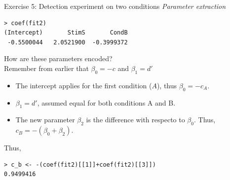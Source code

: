 \documentclass[10pt]{beamer}
\begin{document}
\begin{frame}[fragile]{Exercise 5: Detection experiment on two conditions}
\textit{Parameter extraction}
\begin{verbatim}
> coef(fit2)
(Intercept)       StimS       CondB 
 -0.5500044   2.0521900  -0.3999372 
\end{verbatim}

How are these parameters encoded?\\[10pt]
\pause
Remember from earlier that $\beta_0 = -c$ and $\beta_1 = d'$\\[5pt]

\begin{itemize}
\item The intercept applies for the first condition ($A$), thus
$\beta_0 = -c_A$.
\item $\beta_1 = d'$, assumed equal for both conditions A and B.
\item The new parameter $\beta_2$ is the difference with respecto to $\beta_0$. Thus, $c_B = - (\beta_0 + \beta_2)$.
\end{itemize}

Thus,
\begin{verbatim}
> c_b <- -(coef(fit2)[[1]]+coef(fit2)[[3]])
0.9499416
\end{verbatim}
\end{frame}
\end{document}
